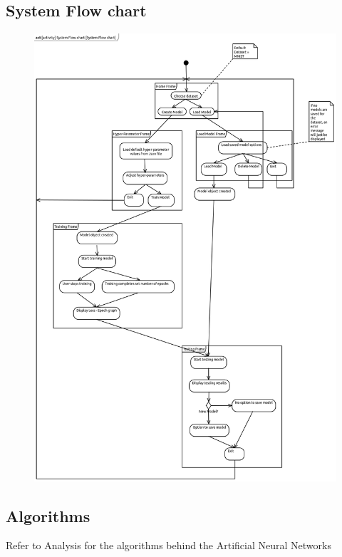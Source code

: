 \documentclass[./project-report/src/latex/project-report.tex]{subfiles}
\begin{document}
\pagebreak

\subsection{System Flow chart}

\begin{figure}[h!]
\centering
\includegraphics[width=1\textwidth]{./project-report/src/images/system-flow-chart.png}
\end{figure}

\subsection{Algorithms}

Refer to Analysis for the algorithms behind the Artificial Neural Networks
\end{document}
